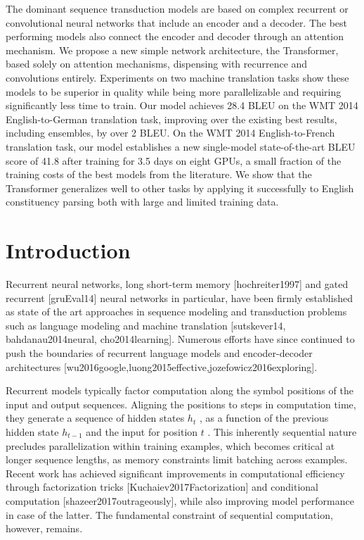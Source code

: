 \documentclass[11pt,a4paper]{article}
\begin{document}
The dominant sequence transduction models are based on complex recurrent or convolutional neural networks that include an encoder and a decoder. The best performing models also connect the encoder and decoder through an attention mechanism. We propose a new simple network architecture, the Transformer, based solely on attention mechanisms, dispensing with recurrence and convolutions entirely. Experiments on two machine translation tasks show these models to be superior in quality while being  more parallelizable and requiring significantly less time to train. Our model achieves 28.4 BLEU on the WMT 2014 English-to-German translation task, improving over the existing best results, including ensembles, by over 2 BLEU.  On the WMT 2014 English-to-French translation task, our model establishes a new single-model state-of-the-art BLEU score of 41.8 after training for 3.5 days on eight GPUs, a small fraction of the training costs of the best models from the literature. We show that the Transformer generalizes well to other tasks by applying it successfully to English constituency parsing  both with large and limited training data.

\section{Introduction}

Recurrent neural networks, long short-term memory [hochreiter1997] and gated recurrent [gruEval14] neural networks in particular, have been firmly established as state of the art approaches in sequence modeling and transduction problems such as language modeling and machine translation [sutskever14, bahdanau2014neural, cho2014learning]. Numerous efforts have since continued to push the boundaries of recurrent language models and encoder-decoder architectures [wu2016google,luong2015effective,jozefowicz2016exploring].

Recurrent models typically factor computation along the symbol positions of the input and output sequences. Aligning the positions to steps in computation time, they generate a sequence of hidden states  $h_t$ , as a function of the previous hidden state  $h_{t-1}$  and the input for position  $t$ . This inherently sequential nature precludes parallelization within training examples, which becomes critical at longer sequence lengths, as memory constraints limit batching across examples. Recent work has achieved significant improvements in computational efficiency through factorization tricks [Kuchaiev2017Factorization] and conditional computation [shazeer2017outrageously], while also improving model performance in case of the latter. The fundamental constraint of sequential computation, however, remains.
\end{document}
